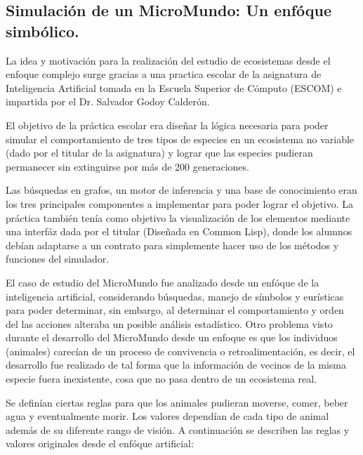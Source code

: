 \subsection{Simulación de un MicroMundo: Un enfóque simbólico.}
  La idea y motivación para la realización del estudio de ecosistemas desde el enfoque complejo surge gracias a una practica escolar de la asignatura de Inteligencia Artificial tomada en la Escuela Superior de Cómputo (ESCOM) e impartida por el Dr. Salvador Godoy Calderón.

  El objetivo de la práctica escolar era diseñar la lógica necesaria para poder simular el comportamiento de tres tipos de especies en un ecosistema no variable (dado por el titular de la asignatura) y lograr que las especies pudieran permanecer sin extinguirse por más de 200 generaciones.

  Las búsquedas en grafos, un motor de inferencia y una base de conocimiento eran los tres principales componentes a implementar para poder lograr el objetivo. La práctica también tenía como objetivo la visualización de los elementos mediante una interfáz dada por el titular (Diseñada en Common Lisp), donde los alumnos debían adaptarse a un contrato para simplemente hacer uso de los métodos y funciones del simulador.

  El caso de estudio del MicroMundo fue analizado desde un enfóque de la inteligencia artificial, considerando búsquedas, manejo de símbolos y eurísticas para poder determinar, sin embargo, al determinar el comportamiento y orden del las acciones alteraba un posible análisis estadístico. Otro problema visto durante el desarrollo del MicroMundo desde un enfoque es que los individuos (animales) carecían de un proceso de convivencia o retroalimentación, es decir, el desarrollo fue realizado de tal forma que la información de vecinos de la misma especie fuera inexistente, cosa que no pasa dentro de un ecosistema real.

  Se definían ciertas reglas para que los animales pudieran moverse, comer, beber agua y eventualmente morir. Los valores dependían de cada tipo de animal además de su diferente rango de visión. A continuación se describen las reglas y valores originales desde el enfóque artificial:

